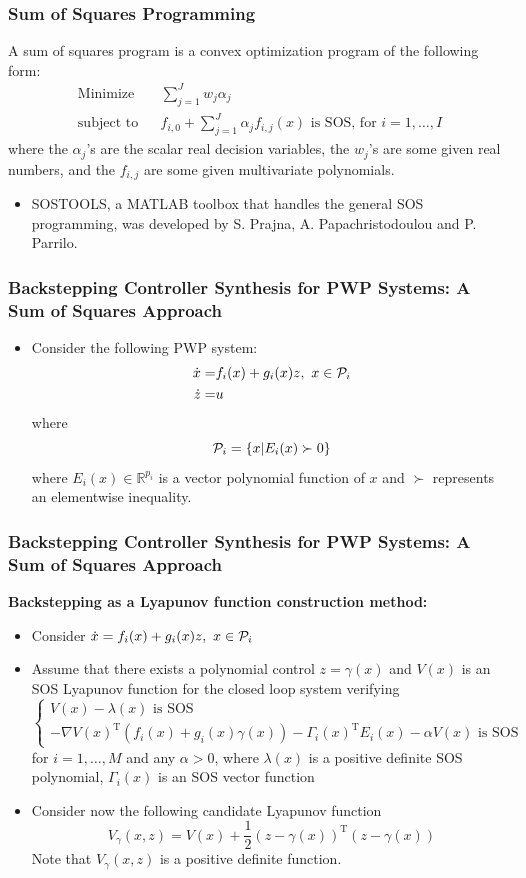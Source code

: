 \documentclass{beamer}
\newcommand{\TR}{\text{T}}
\newcommand{\PR}{{\cal P}}
\newcommand{\RE}{{\mathbb R}}
\newcommand{\beq}{\begin{equation*}}
\newcommand{\eeq}{\end{equation*}}
\begin{document}
  \frame
  {
    \frametitle{Sum of Squares Programming}
A sum of squares program is a convex optimization program of the following form:
\begin{eqnarray*}
\text{Minimize}&&\sum_{j=1}^Jw_j\alpha_j\\
\text{subject to}&&f_{i,0}+\sum_{j=1}^J\alpha_jf_{i,j}(x) \text{ is SOS, for }i=1,\ldots,I
\end{eqnarray*}
where the $\alpha_j$'s are the scalar real decision variables, the $w_j$'s are some given real numbers, and the $f_{i,j}$ are some given multivariate polynomials.
\begin{itemize}
\item<2-> SOSTOOLS, a MATLAB toolbox that handles the general SOS programming, was developed by S. Prajna, A. Papachristodoulou and P. Parrilo. 
\end{itemize}    
}
\frame
  {
    \frametitle{Backstepping Controller Synthesis for PWP Systems: A Sum of Squares Approach}
\begin{itemize}
\item Consider the following PWP system:
\begin{align*}
\dot x =& f_i(x)+g_i(x)z,\ x\in\PR_i\\
\dot z =&u
\end{align*}
where
\beq
\PR_i = \{ x| E_i(x) \succ 0\}
\eeq
where $E_i(x)\in\RE^{p_i}$ is a vector polynomial function of $x$ and $\succ$ represents an elementwise inequality.
\end{itemize}
}

\frame
  {
    \frametitle{Backstepping Controller Synthesis for PWP Systems: A Sum of Squares Approach}
\textbf{Backstepping as a Lyapunov function construction method:}
\begin{itemize}
\item<1-> Consider $\dot x = f_i(x)+g_i(x)z,\ x\in\PR_i$
\item<2-> Assume that there exists a polynomial control $z=\gamma(x)$ and $V(x)$ is an SOS Lyapunov function for the closed loop system verifying
\beq
\left\{\begin{array}{l}V(x)-\lambda(x)\text{\ is SOS}\\
-\nabla V(x)^\TR(f_i(x)+g_i(x)\gamma(x))-\Gamma_i(x)^\TR E_i(x)-\alpha V(x)\text{\ is SOS}\end{array}\right.
\eeq
for $i=1,\ldots,M$ and any $\alpha>0$, where $\lambda(x)$ is a positive definite SOS polynomial, $\Gamma_i(x)$ is an SOS vector function
\item<3-> Consider now the following candidate Lyapunov function 
\beq
V_\gamma(x,z)=V(x)+\frac{1}{2}(z-\gamma(x))^\TR (z-\gamma(x))
\eeq
Note that $V_\gamma(x,z)$ is a positive definite function. 
\end{itemize}
}
\end{document}
